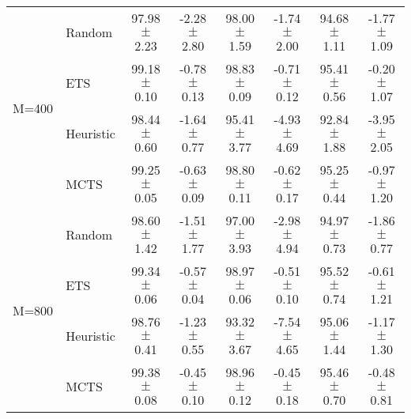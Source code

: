 \begin{tabular}{llcccccc}
\midrule
\multirow{4}{*}{M=400} & Random          & 97.98 $\pm$ 2.23      & -2.28 $\pm$ 2.80     & 98.00 $\pm$ 1.59         & -1.74 $\pm$ 2.00         & 94.68 $\pm$ 1.11       & -1.77 $\pm$ 1.09       \\
                       & ETS             & 99.18 $\pm$ 0.10      & -0.78 $\pm$ 0.13     & 98.83 $\pm$ 0.09         & -0.71 $\pm$ 0.12         & 95.41 $\pm$ 0.56       & -0.20 $\pm$ 1.07       \\
                       & Heuristic         & 98.44 $\pm$ 0.60      & -1.64 $\pm$ 0.77     & 95.41 $\pm$ 3.77         & -4.93 $\pm$ 4.69         & 92.84 $\pm$ 1.88       & -3.95 $\pm$ 2.05       \\
                       & MCTS            & 99.25 $\pm$ 0.05      & -0.63 $\pm$ 0.09     & 98.80 $\pm$ 0.11         & -0.62 $\pm$ 0.17         & 95.25 $\pm$ 0.44       & -0.97 $\pm$ 1.20       \\
\midrule
\multirow{4}{*}{M=800} & Random          & 98.60 $\pm$ 1.42      & -1.51 $\pm$ 1.77     & 97.00 $\pm$ 3.93         & -2.98 $\pm$ 4.94         & 94.97 $\pm$ 0.73       & -1.86 $\pm$ 0.77       \\
                       & ETS             & 99.34 $\pm$ 0.06      & -0.57 $\pm$ 0.04     & 98.97 $\pm$ 0.06         & -0.51 $\pm$ 0.10         & 95.52 $\pm$ 0.74       & -0.61 $\pm$ 1.21       \\
                       & Heuristic         & 98.76 $\pm$ 0.41      & -1.23 $\pm$ 0.55     & 93.32 $\pm$ 3.67         & -7.54 $\pm$ 4.65         & 95.06 $\pm$ 1.44       & -1.17 $\pm$ 1.30       \\
                       & MCTS            & 99.38 $\pm$ 0.08      & -0.45 $\pm$ 0.10     & 98.96 $\pm$ 0.12         & -0.45 $\pm$ 0.18         & 95.46 $\pm$ 0.70       & -0.48 $\pm$ 0.81      \\
\bottomrule
\end{tabular}
